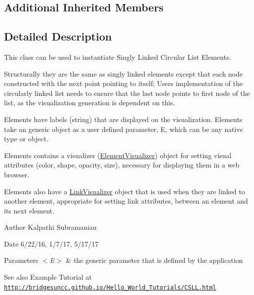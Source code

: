 \subsection*{Additional Inherited Members}


\subsection{Detailed Description}
This class can be used to instantiate Singly Linked Circular List Elements. 

Structurally they are the same as singly linked elements except that each node constructed with the next point pointing to itself; User\textquotesingle{}s implementation of the circularly linked list needs to ensure that the last node points to first node of the list, as the visualization generation is dependent on this.

Elements have labels (string) that are displayed on the visualization. Elements take an generic object as a user defined parameter, E, which can be any native type or object.

Elements contains a visualizer (\mbox{\hyperlink{classbridges_1_1base_1_1_element_visualizer}{Element\+Visualizer}}) object for setting visual attributes (color, shape, opacity, size), necessary for displaying them in a web browser.

Elements also have a \mbox{\hyperlink{classbridges_1_1base_1_1_link_visualizer}{Link\+Visualizer}} object that is used when they are linked to another element, appropriate for setting link attributes, between an element and its next element.

\begin{DoxyAuthor}{Author}
Kalpathi Subramanian
\end{DoxyAuthor}
\begin{DoxyDate}{Date}
6/22/16, 1/7/17, 5/17/17
\end{DoxyDate}

\begin{DoxyParams}{Parameters}
{\em $<$\+E$>$} & the generic parameter that is defined by the application\\
\hline
\end{DoxyParams}
\begin{DoxySeeAlso}{See also}
Example Tutorial at ~\newline
 \href{http://bridgesuncc.github.io/Hello_World_Tutorials/CSLL.html}{\tt http\+://bridgesuncc.\+github.\+io/\+Hello\+\_\+\+World\+\_\+\+Tutorials/\+C\+S\+L\+L.\+html} 
\end{DoxySeeAlso}



